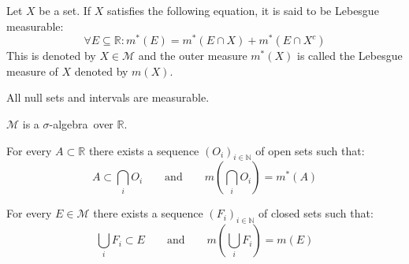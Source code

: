         \begin{theorem}
        	Let $X$ be a set. If $X$ satisfies the following equation, it is said to be Lebesgue measurable:
		\begin{equation}
			\label{lebesgue:lebesgue_measure}
                	\forall E\subseteq\mathbb{R}:m^*(E) = m^*(E\cap X) + m^*(E\cap X^c)
		\end{equation}
		This is denoted by $X\in\mathcal{M}$ and the outer measure $m^*(X)$ is called the Lebesgue measure of $X$ denoted by $m(X)$.
        \end{theorem}
        \begin{property}
		All null sets and intervals are measurable.
	\end{property}
        
        \begin{property}
		$\mathcal{M}$ is a $\sigma$-algebra\footnotemark\ over $\mathbb{R}$.
	\end{property}
        
        \begin{theorem}
		For every $A\subset\mathbb{R}$ there exists a sequence $(O_i)_{i\in\mathbb{N}}$ of open sets such that:
        	\begin{equation}
            		\label{lebesgue:theorem:open_cover_existence}
			A\subset\bigcap_iO_i\qquad\text{and}\qquad m\left(\bigcap_iO_i\right) = m^*(A)
		\end{equation}
	\end{theorem}
        \begin{theorem}
		For every $E\in\mathcal{M}$ there exists a sequence $(F_i)_{i\in\mathbb{N}}$ of closed sets such that:
		\begin{equation}
            		\label{lebesgue:theorem:closed_cover_existence}
			\bigcup_iF_i\subset E\qquad\text{and}\qquad m\left(\bigcup_iF_i\right) = m(E)
		\end{equation}
	\end{theorem}
        
